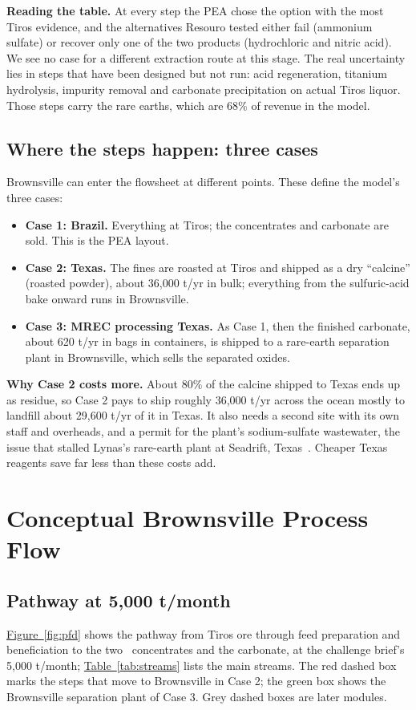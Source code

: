 \documentclass[11pt,letterpaper]{article}
\newcommand{\tio}{\ce{TiO2}}
\newcommand{\tref}[1]{\hyperref[#1]{Table~\ref*{#1}}}
\newcommand{\fref}[1]{\hyperref[#1]{Figure~\ref*{#1}}}
\begin{document}
\textbf{Reading the table.} At every step the PEA chose the option with the most Tiros evidence, and the alternatives Resouro tested either fail (ammonium sulfate) or recover only one of the two products (hydrochloric and nitric acid). We see no case for a different extraction route at this stage. The real uncertainty lies in steps that have been designed but not run: acid regeneration, titanium hydrolysis, impurity removal and carbonate precipitation on actual Tiros liquor. Those steps carry the rare earths, which are 68\% of revenue in the model.

\subsection{Where the steps happen: three cases}\label{sec:cases}
Brownsville can enter the flowsheet at different points. These define the model's three cases:
\begin{itemize}
\item \textbf{Case 1: Brazil.} Everything at Tiros; the concentrates and carbonate are sold. This is the PEA layout.
\item \textbf{Case 2: Texas.} The fines are roasted at Tiros and shipped as a dry ``calcine'' (roasted powder), about 36,000 t/yr in bulk; everything from the sulfuric-acid bake onward runs in Brownsville.
\item \textbf{Case 3: MREC processing Texas.} As Case 1, then the finished carbonate, about 620 t/yr in bags in containers, is shipped to a rare-earth separation plant in Brownsville, which sells the separated oxides.
\end{itemize}

\textbf{Why Case 2 costs more.} About 80\% of the calcine shipped to Texas ends up as residue, so Case 2 pays to ship roughly 36,000 t/yr across the ocean mostly to landfill about 29,600 t/yr of it in Texas. It also needs a second site with its own staff and overheads, and a permit for the plant's sodium-sulfate wastewater, the issue that stalled Lynas's rare-earth plant at Seadrift, Texas~\cite{lynas}. Cheaper Texas reagents save far less than these costs add.

\section{Conceptual Brownsville Process Flow}\label{sec:pfd}

\subsection{Pathway at 5,000 t/month}\label{sec:pathway}
\fref{fig:pfd} shows the pathway from Tiros ore through feed preparation and beneficiation to the two \tio\ concentrates and the carbonate, at the challenge brief's 5,000 t/month; \tref{tab:streams} lists the main streams. The red dashed box marks the steps that move to Brownsville in Case 2; the green box shows the Brownsville separation plant of Case 3. Grey dashed boxes are later modules.
\end{document}
